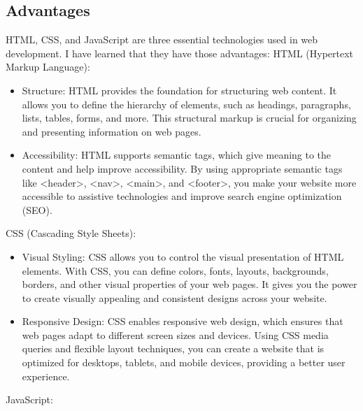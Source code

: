 \documentclass{article}
\begin{document}
\subsection{Advantages}
HTML, CSS, and JavaScript are three essential technologies used in web development. I have learned that they have those advantages:
HTML (Hypertext Markup Language):
\begin{itemize}
\item 	Structure: HTML provides the foundation for structuring web content. It allows you to define the hierarchy of elements, such as headings, paragraphs, lists, tables, forms, and more. This structural markup is crucial for organizing and presenting information on web pages.
\item 	Accessibility: HTML supports semantic tags, which give meaning to the content and help improve accessibility. By using appropriate semantic tags like <header>, <nav>, <main>, and <footer>, you make your website more accessible to assistive technologies and improve search engine optimization (SEO).
\end{itemize}
CSS (Cascading Style Sheets):
\begin{itemize}
\item 	Visual Styling: CSS allows you to control the visual presentation of HTML elements. With CSS, you can define colors, fonts, layouts, backgrounds, borders, and other visual properties of your web pages. It gives you the power to create visually appealing and consistent designs across your website.
\item 	Responsive Design: CSS enables responsive web design, which ensures that web pages adapt to different screen sizes and devices. Using CSS media queries and flexible layout techniques, you can create a website that is optimized for desktops, tablets, and mobile devices, providing a better user experience.
\end{itemize}
JavaScript:
\end{document}
